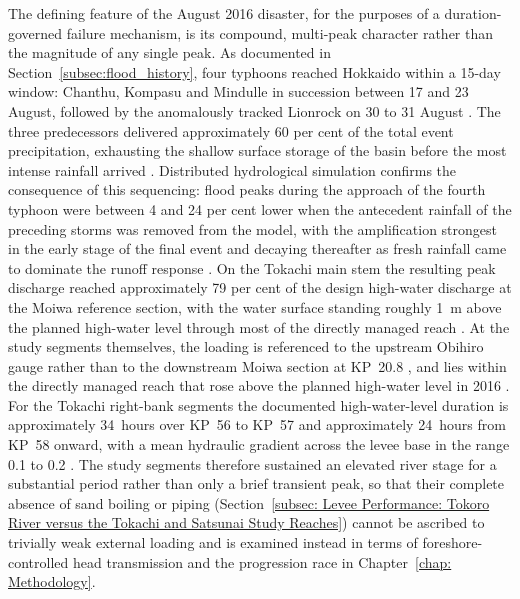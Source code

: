 The defining feature of the August 2016 disaster, for the purposes of a duration-governed failure mechanism, is its compound, multi-peak character rather than the magnitude of any single peak. As documented in Section~\ref{subsec:flood_history}, four typhoons reached Hokkaido within a 15-day window: Chanthu, Kompasu and Mindulle in succession between 17 and 23 August, followed by the anomalously tracked Lionrock on 30 to 31 August \parencite{kimura_2018}. The three predecessors delivered approximately 60 per cent of the total event precipitation, exhausting the shallow surface storage of the basin before the most intense rainfall arrived \parencite{kimura_2018}. Distributed hydrological simulation confirms the consequence of this sequencing: flood peaks during the approach of the fourth typhoon were between 4 and 24 per cent lower when the antecedent rainfall of the preceding storms was removed from the model, with the amplification strongest in the early stage of the final event and decaying thereafter as fresh rainfall came to dominate the runoff response \parencite{kimura_2018}. On the Tokachi main stem the resulting peak discharge reached approximately 79 per cent of the design high-water discharge at the Moiwa reference section, with the water surface standing roughly 1~m above the planned high-water level through most of the directly managed reach \parencite{fukuoka_2019}. At the study segments themselves, the loading is referenced to the upstream Obihiro gauge rather than to the downstream Moiwa section at KP~20.8 \parencite{oyo_1999}, and lies within the directly managed reach that rose above the planned high-water level in 2016 \parencite{fukuoka_2019}. For the Tokachi right-bank segments the documented high-water-level duration is approximately 34~hours over KP~56 to KP~57 and approximately 24~hours from KP~58 onward, with a mean hydraulic gradient across the levee base in the range 0.1 to 0.2 \parencite{fukuda_2025_internal}. The study segments therefore sustained an elevated river stage for a substantial period rather than only a brief transient peak, so that their complete absence of sand boiling or piping (Section~\ref{subsec: Levee Performance: Tokoro River versus the Tokachi and Satsunai Study Reaches}) cannot be ascribed to trivially weak external loading and is examined instead in terms of foreshore-controlled head transmission and the progression race in Chapter~\ref{chap: Methodology}.

